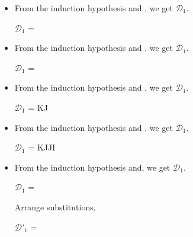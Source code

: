 \begin{itemize}
	\item \QKCsp
	      	      	      	      
	      From the induction hypothesis and \QKCsp, we get $\mathcal{D}_1$.
	      	      	      	      
	      $\mathcal{D}_1$ = 
	      {}
	      	      	      	      
	\item \QKRefl
	      	      	      	      
	      From the induction hypothesis and \QKRefl, we get $\mathcal{D}_1$.
	      	      	      	      
	      $\mathcal{D}_1$ = 
	      {}
	      	      	      	      
	\item \QKSym
	      	      	      	      
	      From the induction hypothesis and \QKSym, we get $\mathcal{D}_1$.
	      	      	      	      
	      $\mathcal{D}_1$ = 
	      {\GGV K\SB\E J\SB@A}
	      	      	      	      
	\item \QKTrans
	      	      	      	      
	      From the induction hypothesis and \QKTrans, we get $\mathcal{D}_1$.
	      	      	      	      
	      $\mathcal{D}_1$ = 
	      {\GGV K\SB\E J\SB@A \andalso \GGV J\SB\E I\SB@A}
	      	      	      	      
	\item \QTAbs
	      	      	      	      
	      From the induction hypothesis and, we get $\mathcal{D}_1$.
	      	      	      	      
	      $\mathcal{D}_1$ = 
	      {\ID{\GG \tau\SB \E \sigma\SB@A} \andalso {}}
	      	      	      	      
	      Arrange substitutions,
	      	      	      	      
	      $\mathcal{D}'_1$ = 
	      {\ID{\GG \tau\SB \E \sigma\SB@A} \andalso {}}
	      	      	      	      

\end{itemize}
